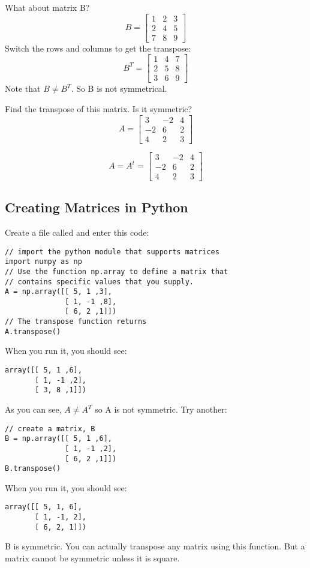 What about matrix B? 
$$
B = \begin{bmatrix}
1 & 2 & 3 \\
2 & 4 & 5 \\
7 & 8 & 9
\end{bmatrix}
$$
Switch the rows and columns to get the transpose:
$$
B^T = \begin{bmatrix}
1 & 4 & 7 \\
2 & 5 & 8 \\
3 & 6 & 9
\end{bmatrix}
$$
Note that $B \neq B^T$. So B is not symmetrical.

\begin{Exercise}[title={Matrix Transposition}, label=matrix-transpose01]
Find the transpose of this matrix. Is it symmetric? 
$$A = \begin{bmatrix}
 		3 &-2  &4  \\
 		-2  &6  &2 \\
 		4  &2  &3 
	  \end{bmatrix}$$
\end{Exercise}
\begin{Answer}[ref=matrix-transpose01]
$$A =  A^t = 
	  \begin{bmatrix}
 		3 &-2  &4  \\
 		-2  &6  &2 \\
 		4  &2  &3 
	\end{bmatrix}$$
\end{Answer}

\subsection{Creating Matrices in Python}
Create a file called  and enter this code:
\begin{Verbatim}
// import the python module that supports matrices
import numpy as np
// Use the function np.array to define a matrix that 
// contains specific values that you supply.
A = np.array([[ 5, 1 ,3], 
              [ 1, -1 ,8], 
              [ 6, 2 ,1]])
// The transpose function returns 
A.transpose()
\end{Verbatim}
When you run it, you should see:
\begin{Verbatim}
array([[ 5, 1 ,6], 
       [ 1, -1 ,2], 
       [ 3, 8 ,1]])
\end{Verbatim}
As you can see, $A\neq A^T$ so A is not symmetric.
Try another: 
\begin{Verbatim}
// create a matrix, B
B = np.array([[ 5, 1 ,6], 
              [ 1, -1 ,2], 
              [ 6, 2 ,1]])
B.transpose()
\end{Verbatim}
When you run it, you should see:
\begin{Verbatim}
array([[ 5, 1, 6], 
       [ 1, -1, 2], 
       [ 6, 2, 1]])
\end{Verbatim}
B is symmetric. You can actually transpose any matrix using this function. But a matrix cannot be symmetric unless it is square. 


